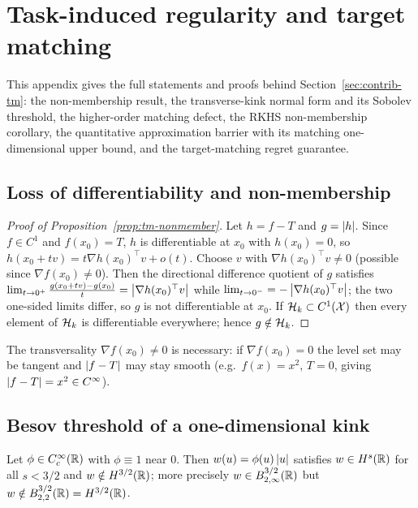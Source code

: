 \section{Task-induced regularity and target matching}
\label{app:tm}

This appendix gives the full statements and proofs behind
Section~\ref{sec:contrib-tm}: the non-membership result, the transverse-kink
normal form and its Sobolev threshold, the higher-order matching defect, the RKHS
non-membership corollary, the quantitative approximation barrier with its
matching one-dimensional upper bound, and the target-matching regret guarantee.

\subsection{Loss of differentiability and non-membership}

\begin{proof}[Proof of Proposition~\ref{prop:tm-nonmember}]
Let $h=f-T$ and $g=\left\lvert h\right\rvert$. Since $f\in C^1$ and $f(x_0)=T$, $h$ is
differentiable at $x_0$ with $h(x_0)=0$, so $h(x_0+tv)=t\nabla h(x_0)^\top v+o(t)$.
Choose $v$ with $\nabla h(x_0)^\top v\neq0$ (possible since $\nabla f(x_0)\neq0$).
Then the directional difference quotient of $g$ satisfies
$\lim_{t\to0^+}\frac{g(x_0+tv)-g(x_0)}{t}=\left\lvert \nabla h(x_0)^\top v\right\rvert$ while
$\lim_{t\to0^-}=-\left\lvert \nabla h(x_0)^\top v\right\rvert$; the two one-sided limits differ, so
$g$ is not differentiable at $x_0$. If $\mathcal{H}_k\subset C^1(\mathcal{X})$ then every element of
$\mathcal{H}_k$ is differentiable everywhere; hence $g\notin\mathcal{H}_k$.
\end{proof}

\begin{remark}
The transversality $\nabla f(x_0)\neq0$ is necessary: if $\nabla f(x_0)=0$ the
level set may be tangent and $\left\lvert f-T\right\rvert$ may stay smooth (e.g.\ $f(x)=x^2$,
$T=0$, giving $\left\lvert f-T\right\rvert=x^2\in C^\infty$).
\end{remark}

\subsection{Besov threshold of a one-dimensional kink}

\begin{lemma}
\label{app:lem-besov}
Let $\phi\in C_c^\infty(\mathbb{R})$ with $\phi\equiv1$ near $0$. Then
$w(u)=\phi(u)\left\lvert u\right\rvert$ satisfies $w\in H^s(\mathbb{R})$ for all $s<3/2$ and
$w\notin H^{3/2}(\mathbb{R})$; more precisely $w\in B^{3/2}_{2,\infty}(\mathbb{R})$ but
$w\notin B^{3/2}_{2,2}(\mathbb{R})=H^{3/2}(\mathbb{R})$.
\end{lemma}

